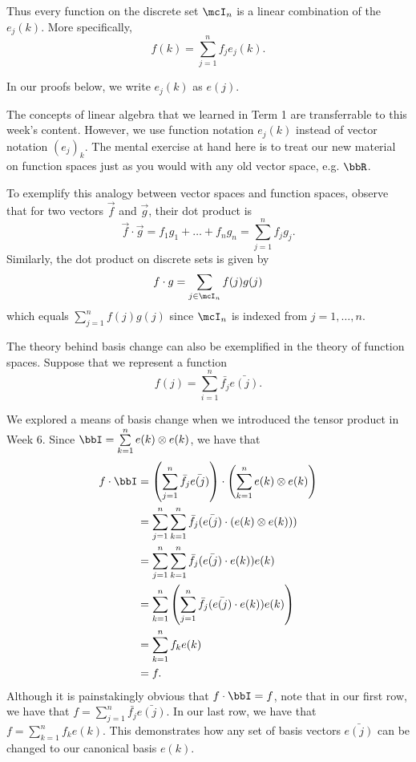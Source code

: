 \documentclass[a4paper, 12pt,oneside,openany]{book}
\begin{document}
Thus every function on the discrete set $\mcI_n$ is a linear combination of the $e_j(k)$. More specifically, $$f(k) = \sum\limits_{j=1}^n f_j e_j(k).$$

 In our proofs below, we write $e_j(k)$ as $e(j)$.

The concepts of linear algebra that we learned in Term 1 are transferrable to this week's content. However, we use function notation $e_j(k)$ instead of vector notation $(e_j)_k$. The mental exercise at hand here is to treat our new material on function spaces just as you would with any old vector space, e.g. $\bbR$.

To exemplify this analogy between vector spaces and function spaces, observe that for two vectors $\vec{f}$ and $\vec{g}$, their dot product is $$\vec{f} \cdot \vec{g} = f_1g_1+\dots+f_ng_n = \sum\limits_{j=1}^n f_jg_j.$$ Similarly, the dot product on discrete sets is given by $$f \cdot g = \sum\limits_{j \in \mcI_n} f(j) g(j)$$ which equals $\sum\limits_{j=1}^n f(j)g(j)$ since $\mcI_n$ is indexed from $j=1, \dots, n$.

The theory behind basis change can also be exemplified in the theory of function spaces. Suppose that we represent a function $$f(j) = \sum\limits_{i=1}^n \bar{f_j} \bar{e(j)}.$$

We explored a means of basis change when we introduced the tensor product in Week 6. Since $\bbI = \sum\limits_{k=1}^n e(k) \otimes e(k)$, we have that \begin{align*} f \cdot \bbI &= \left(\sum\limits_{j=1}^n \bar{f_j} \bar{e(j)}\right) \cdot \left(\sum\limits_{k=1}^n e(k) \otimes e(k)\right) \\ &= \sum\limits_{j=1}^n \sum\limits_{k=1}^n \bar{f_j} (\bar{e(j)} \cdot (e(k) \otimes e(k))) \\ &= \sum\limits_{j=1}^n \sum\limits_{k=1}^n \bar{f_j} (\bar{e(j)} \cdot e(k))e(k) \\ &= \sum\limits_{k=1}^n \left(\sum\limits_{j=1}^n \bar{f_j} (\bar{e(j)} \cdot e(k)) e(k)\right) \\ &= \sum\limits_{k=1}^n f_k e(k) \\ & =f. \end{align*} Although it is painstakingly obvious that $f \cdot \bbI = f$, note that in our first row, we have that $f =\sum\limits_{j=1}^n \bar{f_j} \bar{e(j)}$. In our last row, we have that $f = \sum\limits_{k=1}^n f_k e(k)$. This demonstrates how any set of basis vectors $\bar{e(j)}$ can be changed to our canonical basis $e(k)$. 
\end{document}
